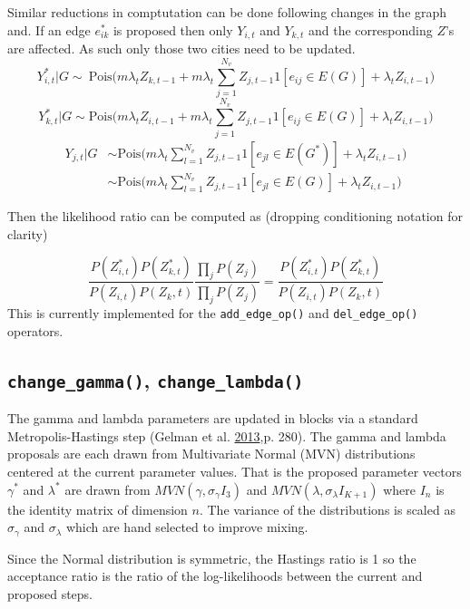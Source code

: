 \documentclass[11pt,a4paper]{article}
\numberwithin{equation}{section}
\begin{document}
Similar reductions in comptutation can be done following changes in the
graph and. If an edge \(e^*_{ik}\) is proposed then only \(Y_{i,t}\) and
\(Y_{k,t}\) and the corresponding \(Z\)'s are affected. As such only
those two cities need to be updated.
\[Y^*_{i,t}|G \sim ~ \text{Pois}\big(m\lambda_tZ_{k,t-1} +m\lambda_t\sum_{j=1}^{N_v}Z_{j,t-1}1[e_{ij}\in E(G)]+ \lambda_tZ_{i,t-1}\big) \]
\[Y^*_{k,t}|G \sim  \text{Pois}\big(m\lambda_tZ_{i,t-1} +m\lambda_t\sum_{j=1}^{N_v}Z_{j,t-1}1[e_{ij}\in E(G)]+ \lambda_tZ_{i,t-1}\big) \]
\[\begin{aligned} Y_{j,t}|G &\sim \text{Pois}\big(m\lambda_t\sum_{l=1}^{N_v}Z_{j,t-1}1[e_{jl}\in E(G^*)]+ \lambda_tZ_{i,t-1}\big)\\ & \sim  \text{Pois}\big(m\lambda_t\sum_{l=1}^{N_v}Z_{j,t-1}1[e_{jl}\in E(G)]+ \lambda_tZ_{i,t-1}\big) \end{aligned}\]

Then the likelihood ratio can be computed as (dropping conditioning
notation for clarity)

\[ \frac{P(Z^*_{i,t})P(Z^*_{k,t})}{P(Z_{i,t})P(Z_k,t)}\frac{\prod_j P(Z_{j})}{\prod_{j}P( Z_{j})} = \frac{P(Z^*_{i,t})P(Z^*_{k,t})}{P(Z_{i,t})P(Z_k,t)} \]
This is currently implemented for the \texttt{add\_edge\_op()} and
\texttt{del\_edge\_op()} operators.

\hypertarget{change_gamma-change_lambda}{%
\subsection{\texorpdfstring{\texttt{change\_gamma()},
\texttt{change\_lambda()}}{change\_gamma(), change\_lambda()}}\label{change_gamma-change_lambda}}

The gamma and lambda parameters are updated in blocks via a standard
Metropolis-Hastings step (Gelman et al.
\protect\hyperlink{ref-gelman_bayesian_2013}{2013},p. 280). The gamma
and lambda proposals are each drawn from Multivariate Normal (MVN)
distributions centered at the current parameter values. That is the
proposed parameter vectors \(\gamma^*\) and \(\lambda^*\) are drawn from
\(MVN(\gamma, \sigma_\gamma I_3)\) and
\(MVN(\lambda, \sigma_\lambda I_{K+1})\) where \(I_n\) is the identity
matrix of dimension \(n\). The variance of the distributions is scaled
as \(\sigma_\gamma\) and \(\sigma_\lambda\) which are hand selected to
improve mixing.

Since the Normal distribution is symmetric, the Hastings ratio is 1 so
the acceptance ratio is the ratio of the log-likelihoods between the
current and proposed steps.
\end{document}
